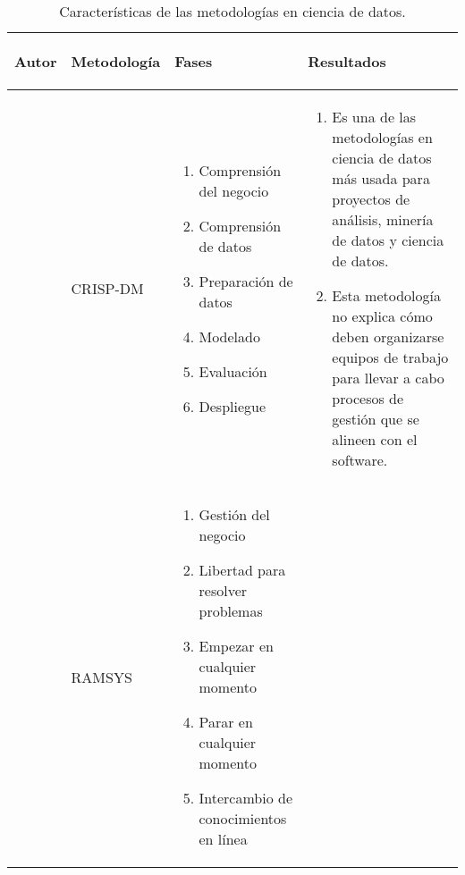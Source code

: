\begin{table*} [!htb]
	\footnotesize
	\begin{threeparttable}
		\caption{Características de las metodologías en ciencia de datos.}
		\label{metodologias}
		\begin{tabular}{p{1cm} p{2cm} p{5cm} p{6.5cm}} \toprule	
			\begin{center}Autor\end{center}   
			&\begin{center}Metodología\end{center}             
			&\begin{center}Fases\end{center}      
			&\begin{center}Resultados\end{center}  
			\\ \hline	
			\cite{Schroer2021}
			&CRISP-DM
			& \begin{enumerate}
				\item Comprensión del negocio
				\item Comprensión de datos
				\item Preparación de datos
				\item Modelado
				\item Evaluación
				\item Despliegue 
			\end{enumerate}
			& \begin{enumerate}
				\item Es una de las metodologías en ciencia de datos más usada para proyectos de análisis, minería de datos y ciencia de datos.
				\item Esta metodología no explica cómo deben organizarse equipos de trabajo para llevar a cabo procesos de gestión que se alineen con el software.
			\end{enumerate}
			\\ \hline
			\cite{Mladenic2012}
			&RAMSYS
			& \begin{enumerate}
				\item Gestión del negocio
				\item Libertad para resolver problemas
				\item Empezar en cualquier momento
				\item Parar en cualquier momento
				\item Intercambio de conocimientos en línea 

\end{enumerate}
\end{tabular}
\end{threeparttable}
\end{table*}
